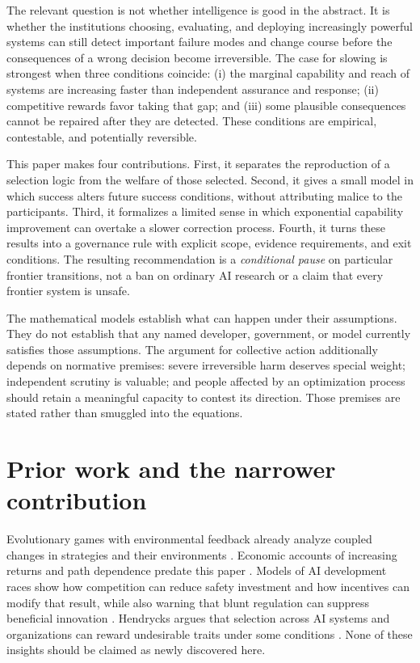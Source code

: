 \documentclass[11pt]{article}
\begin{document}
The relevant question is not whether intelligence is good in the abstract. It is whether the institutions choosing, evaluating, and deploying increasingly powerful systems can still detect important failure modes and change course before the consequences of a wrong decision become irreversible. The case for slowing is strongest when three conditions coincide: (i) the marginal capability and reach of systems are increasing faster than independent assurance and response; (ii) competitive rewards favor taking that gap; and (iii) some plausible consequences cannot be repaired after they are detected. These conditions are empirical, contestable, and potentially reversible.

This paper makes four contributions. First, it separates the reproduction of a selection logic from the welfare of those selected. Second, it gives a small model in which success alters future success conditions, without attributing malice to the participants. Third, it formalizes a limited sense in which exponential capability improvement can overtake a slower correction process. Fourth, it turns these results into a governance rule with explicit scope, evidence requirements, and exit conditions. The resulting recommendation is a \emph{conditional pause} on particular frontier transitions, not a ban on ordinary AI research or a claim that every frontier system is unsafe.

The mathematical models establish what can happen under their assumptions. They do not establish that any named developer, government, or model currently satisfies those assumptions. The argument for collective action additionally depends on normative premises: severe irreversible harm deserves special weight; independent scrutiny is valuable; and people affected by an optimization process should retain a meaningful capacity to contest its direction. Those premises are stated rather than smuggled into the equations.

\section{Prior work and the narrower contribution}

Evolutionary games with environmental feedback already analyze coupled changes in strategies and their environments \cite{tilman2020}. Economic accounts of increasing returns and path dependence predate this paper \cite{arthur1989}. Models of AI development races show how competition can reduce safety investment and how incentives can modify that result, while also warning that blunt regulation can suppress beneficial innovation \cite{han2021,cimpeanu2022}. Hendrycks argues that selection across AI systems and organizations can reward undesirable traits under some conditions \cite{hendrycks2023}. None of these insights should be claimed as newly discovered here.
\end{document}

